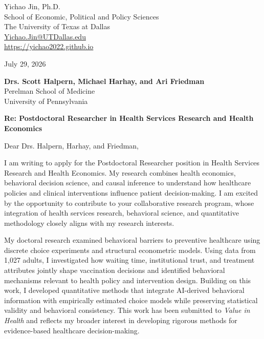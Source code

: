 \documentclass[11pt, letterpaper]{article}
\begin{document}
\thispagestyle{empty}

\begin{flushleft}
Yichao Jin, Ph.D.\\
School of Economic, Political and Policy Sciences\\
The University of Texas at Dallas\\
\href{mailto:Yichao.Jin@UTDallas.edu}{Yichao.Jin@UTDallas.edu}\\
\href{https://yichao2022.github.io}{https://yichao2022.github.io}
\end{flushleft}

\vspace{0.3em}

\begin{flushleft}
July 29, 2026
\end{flushleft}

\vspace{0.3em}

\begin{flushleft}
\textbf{Drs. Scott Halpern, Michael Harhay, and Ari Friedman}\\
Perelman School of Medicine\\
University of Pennsylvania
\end{flushleft}

\vspace{0.3em}

\textbf{Re: Postdoctoral Researcher in Health Services Research and Health Economics}

\vspace{0.3em}

Dear Drs. Halpern, Harhay, and Friedman,

I am writing to apply for the Postdoctoral Researcher position in Health Services Research and Health Economics. My research combines health economics, behavioral decision science, and causal inference to understand how healthcare policies and clinical interventions influence patient decision-making. I am excited by the opportunity to contribute to your collaborative research program, whose integration of health services research, behavioral science, and quantitative methodology closely aligns with my research interests.

My doctoral research examined behavioral barriers to preventive healthcare using discrete choice experiments and structural econometric models. Using data from 1,027 adults, I investigated how waiting time, institutional trust, and treatment attributes jointly shape vaccination decisions and identified behavioral mechanisms relevant to health policy and intervention design. Building on this work, I developed quantitative methods that integrate AI-derived behavioral information with empirically estimated choice models while preserving statistical validity and behavioral consistency. This work has been submitted to \textit{Value in Health} and reflects my broader interest in developing rigorous methods for evidence-based healthcare decision-making.
\end{document}
